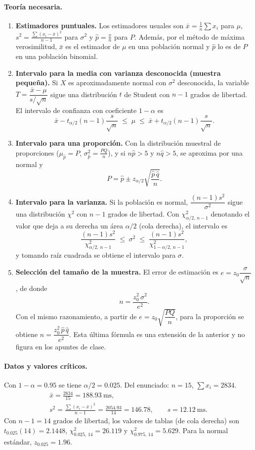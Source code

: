 \documentclass[10pt,letterpaper]{article}
\begin{document}
\paragraph{Teoría necesaria.}
\begin{enumerate}
    \item \textbf{Estimadores puntuales.} Los estimadores usuales son $\bar{x}=\frac{1}{n}\sum x_i$ para $\mu$, $s^2=\frac{\sum (x_i-\bar{x})^2}{n-1}$ para $\sigma^2$ y $\hat{p}=\frac{x}{n}$ para $P$. Además, por el método de máxima verosimilitud, $\bar{x}$ es el estimador de $\mu$ en una población normal y $\hat{p}$ lo es de $P$ en una población binomial.
    \item \textbf{Intervalo para la media con varianza desconocida (muestra pequeña).} Si $X$ es aproximadamente normal con $\sigma^2$ desconocida, la variable $T=\dfrac{\bar{x}-\mu}{s/\sqrt{n}}$ sigue una distribución $t$ de Student con $n-1$ grados de libertad. El intervalo de confianza con coeficiente $1-\alpha$ es
    \[
        \bar{x} - t_{\alpha/2}(n-1)\frac{s}{\sqrt{n}} \;\le\; \mu \;\le\; \bar{x} + t_{\alpha/2}(n-1)\frac{s}{\sqrt{n}} .
    \]
    \item \textbf{Intervalo para una proporción.} Con la distribución muestral de proporciones ($\mu_{\hat{p}}=P$, $\sigma^2_{\hat{p}}=\frac{PQ}{n}$), y si $n\hat{p}>5$ y $n\hat{q}>5$, se aproxima por una normal y
    \[
        P = \hat{p} \pm z_{\alpha/2}\sqrt{\frac{\hat{p}\,\hat{q}}{n}} .
    \]
    \item \textbf{Intervalo para la varianza.} Si la población es normal, $\dfrac{(n-1)s^2}{\sigma^2}$ sigue una distribución $\chi^2$ con $n-1$ grados de libertad. Con $\chi^2_{\alpha/2,\,n-1}$ denotando el valor que deja a su derecha un área $\alpha/2$ (cola derecha), el intervalo es
    \[
        \frac{(n-1)s^2}{\chi^2_{\alpha/2,\,n-1}} \;\le\; \sigma^2 \;\le\; \frac{(n-1)s^2}{\chi^2_{1-\alpha/2,\,n-1}} ,
    \]
    y tomando raíz cuadrada se obtiene el intervalo para $\sigma$.
    \item \textbf{Selección del tamaño de la muestra.} El error de estimación es $e=z_0\dfrac{\sigma}{\sqrt{n}}$, de donde
    \[
        n=\frac{z_0^{2}\,\sigma^{2}}{e^{2}} .
    \]
    Con el mismo razonamiento, a partir de $e=z_0\sqrt{\dfrac{PQ}{n}}$, para la proporción se obtiene $n=\dfrac{z_0^{2}\,\hat{p}\,\hat{q}}{e^{2}}$. Esta última fórmula es una extensión de la anterior y no figura en los apuntes de clase.
\end{enumerate}

\paragraph{Datos y valores críticos.} Con $1-\alpha=0.95$ se tiene $\alpha/2=0.025$. Del enunciado: $n=15$, $\sum x_i = 2834$.
\begin{gather*}
    \bar{x}=\frac{2834}{15}=188.93\ \text{ms}, \\
    s^2=\frac{\sum (x_i-\bar{x})^2}{n-1}=\frac{2054.93}{14}=146.78, \qquad
    s=12.12\ \text{ms}.
\end{gather*}
Con $n-1=14$ grados de libertad, los valores de tablas (de cola derecha) son $t_{0.025}(14)=2.1448$, $\chi^2_{0.025,\,14}=26.119$ y $\chi^2_{0.975,\,14}=5.629$. Para la normal estándar, $z_{0.025}=1.96$.
\end{document}
